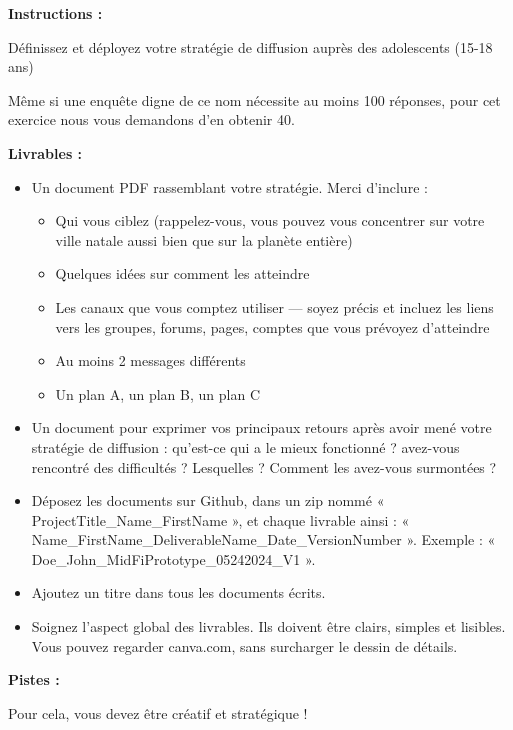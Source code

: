 \makeheaderfiles

\textbf{Instructions :}

Définissez et déployez votre stratégie de diffusion auprès des adolescents (15-18 ans)

Même si une enquête digne de ce nom nécessite au moins 100 réponses, pour cet exercice nous vous demandons d'en obtenir 40.

\textbf{Livrables :}

\begin{itemize}
\item Un document PDF rassemblant votre stratégie. Merci d'inclure :
\begin{itemize}
\item Qui vous ciblez (rappelez-vous, vous pouvez vous concentrer sur votre ville natale aussi bien que sur la planète entière)
\item Quelques idées sur comment les atteindre
\item Les canaux que vous comptez utiliser  ---  soyez précis et incluez les liens vers les groupes, forums, pages, comptes que vous prévoyez d'atteindre
\item Au moins 2 messages différents
\item Un plan A, un plan B, un plan C
\end{itemize}
\item Un document pour exprimer vos principaux retours après avoir mené votre stratégie de diffusion : qu'est-ce qui a le mieux fonctionné ? avez-vous rencontré des difficultés ? Lesquelles ? Comment les avez-vous surmontées ?
\item Déposez les documents sur Github, dans un zip nommé « ProjectTitle\_Name\_FirstName », et chaque livrable ainsi : « Name\_FirstName\_DeliverableName\_Date\_VersionNumber ». Exemple : « Doe\_John\_MidFiPrototype\_05242024\_V1 ».
\item Ajoutez un titre dans tous les documents écrits.
\item Soignez l'aspect global des livrables. Ils doivent être clairs, simples et lisibles. Vous pouvez regarder canva.com, sans surcharger le dessin de détails.
\end{itemize}

\textbf{Pistes :}

Pour cela, vous devez être créatif et stratégique !

